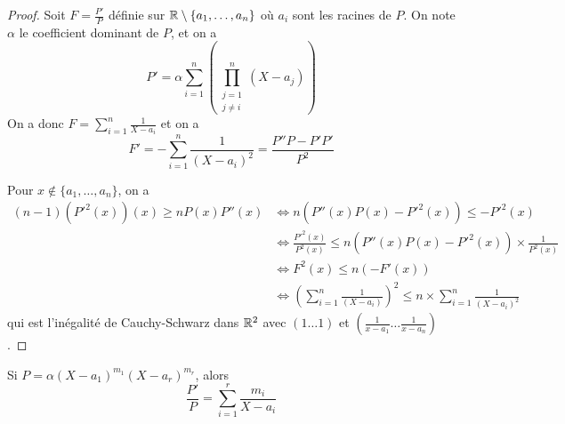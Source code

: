 \begin{proof}
	Soit $F=\frac{P'}{P}$ définie sur $\mathbb{R}\setminus\{a_{1},\dots,a_{n}\}$ où $a_{i}$ sont les racines de $P$. On note $\alpha$ le coefficient dominant de $P$, et on a 
	\begin{equation}
		P'=\alpha\sum_{i=1}^{n}\left(\prod_{\substack{j=1\\ j\neq i}}^{n}(X-a_{j})\right)
	\end{equation}
	On a donc $F=\sum_{i=1}^{n}\frac{1}{X-a_{i}}$ et on a 
	\begin{equation}
		F'=-\sum_{i=1}^{n}\frac{1}{(X-a_{i})^{2}}=\frac{P''P-P'P'}{P^{2}}
	\end{equation}

	Pour $x\notin\{a_{1},\dots,a_{n}\}$, on a 
	\begin{align}
		(n-1)(P'^{2}(x))(x)\geqslant nP(x)P''(x)
		&\Longleftrightarrow n(P''(x)P(x)-P'^{2}(x))\leqslant-P'^{2}(x)\\
		&\Longleftrightarrow \frac{P'^{2}(x)}{P^{2}(x)}\leqslant n(P''(x)P(x)-P'^{2}(x))\times\frac{1}{P^{2}(x)}\\
		&\Longleftrightarrow F^{2}(x)\leqslant n(-F'(x))\\
		&\Longleftrightarrow\left(\sum_{i=1}^{n}\frac{1}{(X-a_{i})}\right)^{2}\leqslant \boxed{n\times\sum_{i=1}^{n}\frac{1}{(X-a_{i})^{2}}}
	\end{align}
	qui est l'inégalité de Cauchy-Schwarz dans $\mathbb{R}^{2}$ avec $(1\dots 1)$ et $(\frac{1}{x-a_{1}}\dots\frac{1}{x-a_{n}})$.
\end{proof}

\begin{remark}
	Si $P=\alpha(X-a_{1})^{m_{1}}(X-a_{r})^{m_{r}}$, alors 
	\begin{equation}
		\frac{P'}{P}=\sum_{i=1}^{r}\frac{m_{i}}{X-a_{i}}
	\end{equation}
\end{remark}


